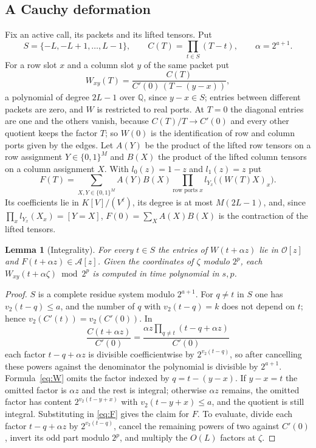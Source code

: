 \documentclass[11pt,reqno]{amsart}
\numberwithin{equation}{section}
\theoremstyle{plain}
\newtheorem{lemma}[theorem]{Lemma}
\theoremstyle{definition}
\theoremstyle{remark}
\newcommand{\Q}{\mathbb{Q}}
\newcommand{\cO}{\mathcal{O}}
\newcommand{\cA}{\mathcal{A}}
\newcommand{\vtwo}{v_2}
\begin{document}
\subsection{A Cauchy deformation}\label{app:cauchy}
Fix an active call, its packets and its lifted tensors. Put
\[
S=\{-L,-L+1,\dots,L-1\},\qquad C(T)=\prod_{t\in S}(T-t),\qquad \alpha=2^{a+1}.
\]
For a row slot $x$ and a column slot $y$ of the same packet put
\begin{equation}\label{eq:W}
W_{xy}(T)=\frac{C(T)}{C'(0)\,(T-(y-x))},
\end{equation}
a polynomial of degree $2L-1$ over $\Q$, since $y-x\in S$; entries between
different packets are zero, and $W$ is restricted to real ports. At $T=0$ the
diagonal entries are one and the others vanish, because $C(T)/T\to C'(0)$ and
every other quotient keeps the factor $T$; so $W(0)$ is the identification of
row and column ports given by the edges. Let $A(Y)$ be the product of the
lifted row tensors on a row assignment $Y\in\{0,1\}^M$ and $B(X)$ the product of
the lifted column tensors on a column assignment $X$. With $l_0(z)=1-z$ and
$l_1(z)=z$ put
\begin{equation}\label{eq:F}
F(T)=\sum_{X,Y\in\{0,1\}^M}A(Y)B(X)\prod_{\text{row ports }x}l_{Y_x}\bigl((W(T)X)_x\bigr).
\end{equation}
Its coefficients lie in $K[V]/(V^\ell)$, its degree is at most $M(2L-1)$, and,
since $\prod_xl_{Y_x}(X_x)=[Y=X]$, $F(0)=\sum_XA(X)B(X)$ is the contraction of the
lifted tensors.

\begin{lemma}[Integrality]\label{lem:integral}
For every $t\in S$ the entries of $W(t+\alpha z)$ lie in $\cO[z]$ and
$F(t+\alpha z)\in\cA[z]$. Given the coordinates of $\zeta$ modulo $2^p$, each
$W_{xy}(t+\alpha\zeta)\bmod2^p$ is computed in time polynomial in $s,p$.
\end{lemma}

\begin{proof}
$S$ is a complete residue system modulo $2^{a+1}$. For $q\ne t$ in $S$ one has
$\vtwo(t-q)\le a$, and the number of $q$ with $\vtwo(t-q)=k$ does not depend on
$t$; hence $\vtwo(C'(t))=\vtwo(C'(0))$. In
\[
\frac{C(t+\alpha z)}{C'(0)}=\frac{\alpha z\prod_{q\ne t}(t-q+\alpha z)}{C'(0)}
\]
each factor $t-q+\alpha z$ is divisible coefficientwise by $2^{\vtwo(t-q)}$, so
after cancelling these powers against the denominator the polynomial is
divisible by $2^{a+1}$. Formula~\eqref{eq:W} omits the factor indexed by
$q=t-(y-x)$. If $y-x=t$ the omitted factor is $\alpha z$ and the rest is
integral; otherwise $\alpha z$ remains, the omitted factor has content
$2^{\vtwo(t-y+x)}$ with $\vtwo(t-y+x)\le a$, and the quotient is still
integral. Substituting in \eqref{eq:F} gives the claim for $F$. To evaluate,
divide each factor $t-q+\alpha z$ by $2^{\vtwo(t-q)}$, cancel the remaining
powers of two against $C'(0)$, invert its odd part modulo $2^p$, and multiply
the $O(L)$ factors at $\zeta$.
\end{proof}
\end{document}
